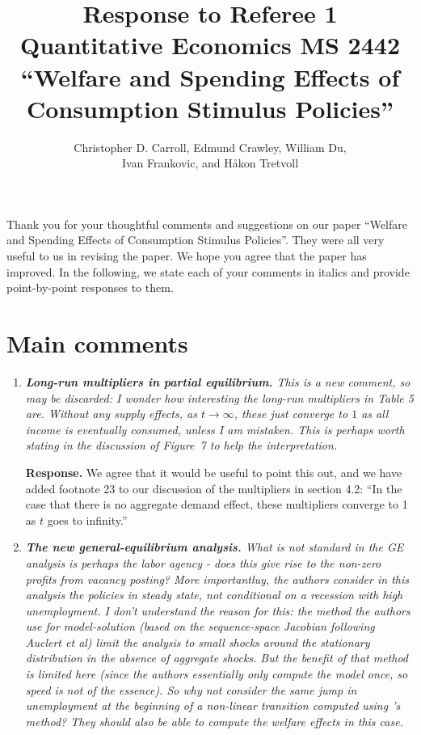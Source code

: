 \documentclass[12pt,letterpaper,english]{article}
\title{\textbf{Response to Referee 1\\ Quantitative Economics MS 2442 \\``Welfare and Spending Effects of \\ Consumption Stimulus Policies''}}
\author{Christopher D. Carroll, Edmund Crawley, William Du, \\ Ivan Frankovic, and H\aa kon Tretvoll}
\date{}
\begin{document}
	\onehalfspacing
	\maketitle
	
\noindent Thank you for your thoughtful comments and suggestions on our paper ``Welfare and Spending Effects of Consumption Stimulus Policies''. They were all very useful to us in revising the paper. We hope you agree that the paper has improved. In the following, we state each of your comments in italics and provide point-by-point responses to them.


\section*{Main comments}
\begin{enumerate}[label=(\alph*)]
	\item \textit{\textbf{Long-run multipliers in partial equilibrium.} This is a new comment, so
		may be discarded: I wonder how interesting the long-run multipliers	in Table 5 are. Without any supply effects, as $t \rightarrow \infty$, these just converge to $1$ as all income is eventually consumed, unless I am mistaken. This is perhaps worth stating in the discussion of Figure~7 to help the interpretation.}
	
	\noindent \textbf{Response.} We agree that it would be useful to point this out, and we have added footnote 23 to our discussion of the multipliers in section 4.2: ``In the case that there is no aggregate demand effect, these multipliers converge to 1 as $t$ goes to infinity.''
	
	\item \textit{\textbf{The new general-equilibrium analysis.} What is not standard in the GE analysis is perhaps the labor agency - does this give rise to the non-zero profits from vacancy posting? More importantluy, the authors consider in this analysis the policies in steady state, not conditional	on a recession with high unemployment. I don't understand the reason for this: the method the authors use for model-solution (based on the sequence-space Jacobian following Auclert et al) limit the analysis to small shocks around the stationary distribution in the absence of aggregate shocks. But the benefit of that method is	limited here (since the authors essentially only compute the model once, so speed is not of the essence). So why not consider the same jump in unemployment at the beginning of a non-linear transition computed using \citet{boppart2018exploiting}'s method? They should also be able to compute the welfare effects in this case.}
	

\end{enumerate}
\end{document}
